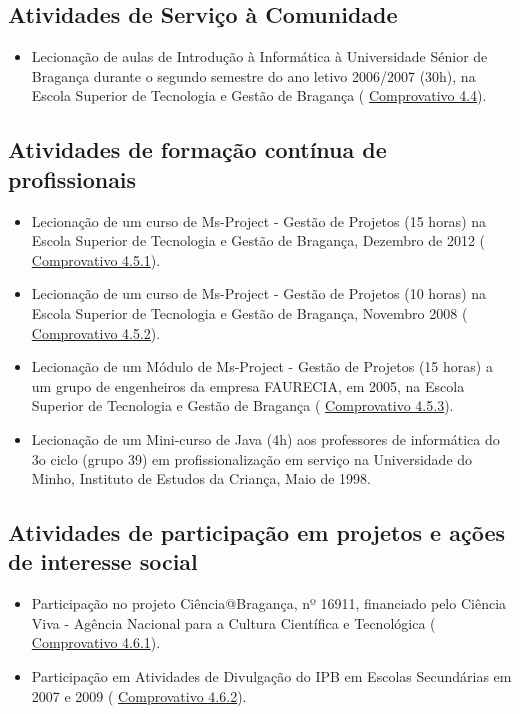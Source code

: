 \documentclass[11pt]{article}
\begin{document}
\subsection{Atividades de Serviço à Comunidade}
\begin{itemize}
\item{Lecionação de aulas de Introdução à Informática à Universidade Sénior de Bragança durante o segundo semestre do ano letivo 2006/2007 (30h), na Escola Superior de Tecnologia e Gestão de Bragança (
\href{run:MissaoIPBoutros/univSenior.pdf}{Comprovativo 4.4}).}
\end{itemize} 
\subsection{Atividades de formação contínua de profissionais}
\begin{itemize}
\item{Lecionação de um curso de Ms-Project - Gestão de Projetos (15 horas) na Escola Superior de Tecnologia e Gestão de Bragança, Dezembro de 2012 (
\href{run:MissaoIPBoutros/msproject2012.pdf}{Comprovativo 4.5.1}).}
\item{Lecionação de um curso de Ms-Project - Gestão de Projetos (10 horas) na Escola Superior de Tecnologia e Gestão de Bragança, Novembro 2008 (
\href{run:MissaoIPBoutros/msproject2008.pdf}{Comprovativo 4.5.2}).}
\item{Lecionação de um Módulo de Ms-Project - Gestão de Projetos (15 horas) a um grupo de engenheiros da empresa FAURECIA, em 2005, na Escola Superior de Tecnologia e Gestão de Bragança (
\href{run:MissaoIPBoutros/CursoFaurecia.pdf}{Comprovativo 4.5.3}).}
\item{Lecionação de um Mini-curso de Java (4h) aos professores de informática do 3o ciclo (grupo 39) em profissionalização em serviço na Universidade do Minho, Instituto de Estudos da Criança, Maio de 1998.}
\end{itemize}
\subsection{Atividades de participação em projetos e ações de interesse social}
\begin{itemize}
\item{Participação no projeto Ciência@Bragança, nº 16911, financiado pelo Ciência Viva - Agência Nacional para a Cultura Científica e Tecnológica (
\href{run:MissaoIPBoutros/CienciaBraganca.pdf}{Comprovativo 4.6.1}).}
\item{Participação em Atividades de Divulgação do IPB em Escolas Secundárias em 2007 e 2009 (
\href{run:MissaoIPBoutros/divulgacao.pdf}{Comprovativo 4.6.2}).}
\end{itemize}
\end{document}
